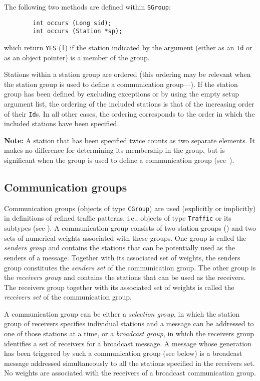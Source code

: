 The following two methods are defined within {\tt SGroup}:
\begin{verbatim}
        int occurs (Long sid);
        int occurs (Station *sp);
\end{verbatim}
which return {\tt YES} (1) if the station indicated by the argument (either
as an {\tt Id} or as an object pointer) is a member of the group.

Stations within a station group are ordered (this ordering may be relevant when
the station group is used to define a communication group---).
If the station group has been defined by excluding exceptions or by using
the empty setup argument list, the ordering
of the included stations is that of the increasing order of their
{\tt Id}s.
In all other cases, the ordering corresponds to the order in which the
included stations have been specified.

\medskip

\noindent
{\bf Note:} A station that has been specified
twice counts as two separate elements.
It makes no difference for determining its membership in the
group, but is significant when the group is used to define a
communication group (see~).

\subsection{Communication groups}
\label{rm_cl_cg}

Communication groups (objects of type {\tt CGroup})
are used (explicitly or implicitly)
in definitions of refined traffic patterns, i.e.,
objects of type {\tt Traffic} or its subtypes (see ).
A communication group consists of two station groups ()
and two sets of numerical weights associated with these groups.
One group is called the {\em senders group\/} and contains the stations that
can be potentially used as the senders of a message.
Together with its associated set of weights, the senders group constitutes
the {\em senders set\/} of the communication group.
The other group is the {\em receivers group\/} and contains the stations that
can be used as the receivers.
The receivers group together with its associated set of weights is called
the {\em receivers set\/} of the communication group.

A communication group can be either a {\em selection group}, in which
the station group of receivers specifies individual stations and
a message can be addressed to one of those stations at a time, or a
{\em broadcast group}, in which the receivers group identifies a set
of receivers for a broadcast message.
A message whose generation has been triggered by such
a communication group (see below) is a broadcast
message addressed simultaneously
to all the stations specified in the receivers set.
No weights are associated with the receivers of a broadcast communication
group.

